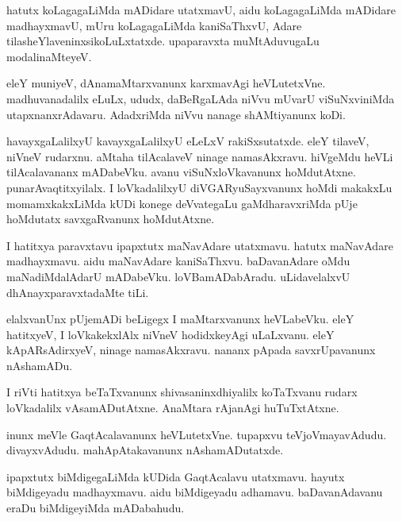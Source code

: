\documentclass{article}
\begin{document}
\begin{mn}
hatutx  koLagagaLiMda  mADidare  utatxmavU,  aidu  koLagagaLiMda  mADidare  madhayxmavU,  mUru  
koLagagaLiMda  kaniSaThxvU,  Adare  tilasheYlaveninxsikoLuLxtatxde.  upaparavxta  muMtAduvugaLu  modalinaMteyeV.
\end{mn}

\begin{mn}
eleY  muniyeV,  dAnamaMtarxvanunx  karxmavAgi  heVLutetxVne.  madhuvanadalilx  eLuLx,  ududx,  
daBeRgaLAda  niVvu  mUvarU  viSuNxviniMda  utapxnanxrAdavaru.  AdadxriMda  niVvu  nanage  shAMtiyanunx koDi.
\end{mn}

\begin{mn}
havayxgaLalilxyU  kavayxgaLalilxyU  eLeLxV  rakiSxsutatxde.  eleY  tilaveV,  niVneV  
rudarxnu.  aMtaha  tilAcalaveV  ninage  namasAkxravu. hiVgeMdu  heVLi  tilAcalavananx  
mADabeVku.  avanu  viSuNxloVkavanunx  hoMdutAtxne.  punarAvaqtitxyilalx.  I  loVkadalilxyU  
diVGARyuSayxvanunx  hoMdi  makakxLu  momamxkakxLiMda  kUDi  konege  deVvategaLu  
gaMdharavxriMda  pUje  hoMdutatx  savxgaRvanunx  hoMdutAtxne.
\end{mn}

\begin{mn}
I  hatitxya  paravxtavu  ipapxtutx maNavAdare  utatxmavu.  hatutx  maNavAdare  madhayxmavu.  
aidu  maNavAdare  kaniSaThxvu.  baDavanAdare  oMdu  maNadiMdalAdarU  mADabeVku.  
loVBamADabAradu.  uLidavelalxvU  dhAnayxparavxtadaMte  tiLi.
\end{mn}

\begin{mn}
elalxvanUnx  pUjemADi  beLigegx  I maMtarxvanunx  heVLabeVku.  eleY  hatitxyeV,  
I loVkakekxlAlx  niVneV  hodidxkeyAgi  uLaLxvanu.  eleY  kApARsAdirxyeV,  ninage  
namasAkxravu.  nananx  pApada  savxrUpavanunx  nAshamADu.
\end{mn}

\begin{mn}
I riVti  hatitxya  beTaTxvanunx  shivasaninxdhiyalilx  koTaTxvanu  rudarx loVkadalilx  
vAsamADutAtxne.  AnaMtara  rAjanAgi  huTuTxtAtxne.
\end{mn}

\begin{mn}
inunx  meVle  GaqtAcalavanunx  heVLutetxVne.  tupapxvu  teVjoVmayavAdudu.  divayxvAdudu.  
mahApAtakavanunx  nAshamADutatxde.  
\end{mn}

\begin{mn}
ipapxtutx  biMdigegaLiMda  kUDida  GaqtAcalavu  utatxmavu.  hayutx  biMdigeyadu  madhayxmavu.  
aidu  biMdigeyadu  adhamavu.  baDavanAdavanu  eraDu  biMdigeyiMda  mADabahudu.
\end{mn}
\end{document}
